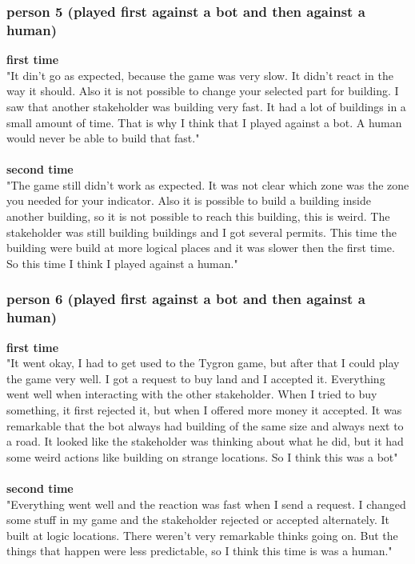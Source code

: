 \subsubsection{person 5 (played first against a bot and then against a human)}
\textbf{first time}\\
"It din't go as expected, because the game was very slow. It didn't react in the way it should. Also it is not possible to change your selected part for building. I saw that another stakeholder was building very fast. It had a lot of buildings in a small amount of time. That is why I think that I played against a bot. A human would never be able to build that fast." 
\\ \\
\textbf{second time} \\ 
"The game still didn't work as expected. It was not clear which zone was the zone you needed for your indicator. Also it is possible to build a building inside another building, so it is not possible to reach this building, this is weird. The stakeholder was still building buildings and I got several permits. This time the building were build at more logical places and it was slower then the first time. So this time I think I played against a human."

\subsubsection{person 6 (played first against a bot and then against a human)}
\textbf{first time}\\
"It went okay, I had to get used to the Tygron game, but after that I could play the game very well. I got a request to buy land and I accepted it. Everything went well when interacting with the other stakeholder. When I tried to buy something, it first rejected it, but when I offered more money it accepted. It was remarkable that the bot always had building of the same size and always next to a road. It looked like the stakeholder was thinking about what he did, but it had some weird actions like building on strange locations. So I think this was a bot"
 \\ \\
\textbf{second time}\\
"Everything went well and the reaction was fast when I send a request. I changed some stuff in my game and the stakeholder rejected or accepted alternately. It built at logic locations. There weren't very remarkable thinks going on. But the things that happen were less predictable, so I think this time is was a human."